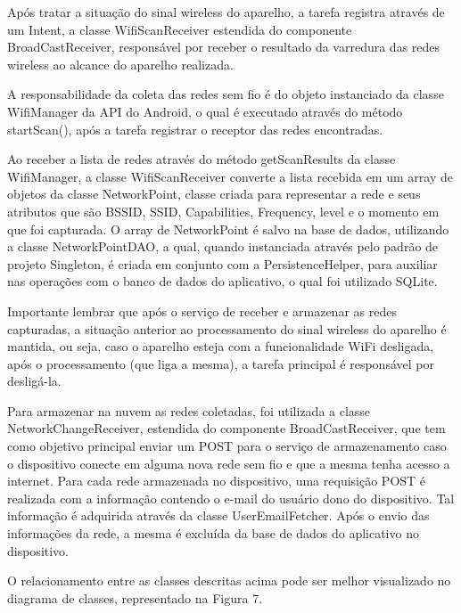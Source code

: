 \documentclass[12pt, %
openright, 
oneside,
a4paper,
brazil]{facom-ufu-abntex2}
\begin{document}
  Após tratar a situação do sinal wireless do aparelho, a tarefa registra através de um Intent, a classe WifiScanReceiver estendida do componente BroadCastReceiver, responsável por receber o resultado da varredura das redes wireless ao alcance do aparelho realizada.
 
 A responsabilidade da coleta das redes sem fio é do objeto instanciado da classe WifiManager da \ac{API} do Android, o qual é executado através do método startScan(), após a tarefa registrar o receptor das redes encontradas.
 
  Ao receber a lista de redes através do método getScanResults da classe WifiManager, a classe WifiScanReceiver converte a lista recebida em um array de objetos da classe NetworkPoint, classe criada para representar a rede e seus atributos que são \ac{BSSID}, \ac{SSID}, Capabilities, Frequency, level e o momento em que foi capturada. O array de NetworkPoint é salvo na base de dados, utilizando a classe NetworkPointDAO, a qual, quando instanciada através pelo padrão de projeto Singleton, é criada em conjunto com a PersistenceHelper, para auxiliar nas operações com o banco de dados do aplicativo, o qual foi utilizado SQLite.
 
 Importante lembrar que após o serviço de receber e armazenar as redes capturadas, a situação anterior ao processamento do sinal wireless do aparelho é mantida, ou seja, caso o aparelho esteja com a funcionalidade \ac{WiFi} desligada, após o processamento (que liga a mesma), a tarefa principal é responsável por desligá-la. 
 
  Para armazenar na nuvem as redes coletadas, foi utilizada a classe NetworkChangeReceiver, estendida do componente BroadCastReceiver, que tem como objetivo principal enviar um POST para o serviço de armazenamento caso o dispositivo conecte em alguma nova rede sem fio e que a mesma tenha acesso a internet. Para cada rede armazenada no dispositivo, uma requisição POST é realizada com a informação contendo o e-mail do usuário dono do dispositivo. Tal informação é adquirida através da classe UserEmailFetcher.  Após o envio das informações da rede, a mesma é excluída da base de dados do aplicativo no dispositivo.

  O relacionamento entre as classes descritas acima pode ser melhor visualizado no diagrama de classes, representado na Figura 7.    
  
\end{document}
